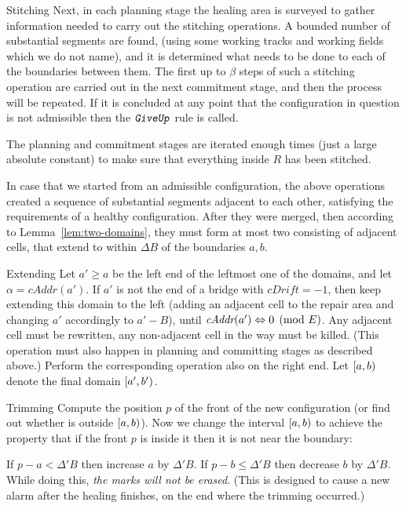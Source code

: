 \documentclass[12pt]{memoir}
\renewcommand{\le}{\leq}
\newcommand{\fld}[1]{\ensuremath{\textit{#1}}}
\newcommand{\rul}[1]{\ensuremath{\texttt{\slshape #1\/}}}
\def\B{B}
\newcommand{\E}{E}
\newcommand{\cAddr}{\fld{cAddr}}
\newcommand{\cDrift}{\fld{cDrift}}
\newcommand{\GiveUp}{\rul{GiveUp}}
\begin{document}
\begin{flushdescription}
\item[Stitching] Next, in each planning stage 
the healing area is surveyed to gather information needed to carry out the
stitching operations.
A bounded number of substantial segments are found, (using some working tracks and working
fields which we do not name), and it is determined what needs to be done
to each of the boundaries between them.
The first up to \( \beta \) steps of such a stitching operation are carried out in the
next commitment stage, and then the process will be repeated.
If it is concluded at any point that the configuration in question is not admissible
then the \( \GiveUp \) rule is called.

The planning and commitment stages are iterated enough times (just a large absolute constant)
to make sure that everything inside \( R \) has been stitched.

In case that we started from an admissible configuration, the above operations
created a sequence of substantial segments adjacent to each other, satisfying the 
requirements of a healthy configuration.
After they were merged, then according to Lemma~\ref{lem:two-domains},
they must form at most two  consisting of adjacent cells, that extend
to within \( \Delta\B \) of the boundaries \( a,b \).

\item[Extending]
Let \( a'\ge a \) be the left end of the leftmost one of the domains,
and let \( \alpha=\cAddr(a') \).
If \( a' \) is not the end of a bridge with \( \cDrift=-1 \), then
keep extending this domain to the left (adding an adjacent cell
to the repair area and changing \( a' \) accordingly to \( a'-\B \)),
until \( \cAddr(a')\eqv 0\pmod{\E} \).
Any adjacent cell must be rewritten, any non-adjacent cell in the way must be killed.
(This operation must also happen in planning and committing stages as described above.)
Perform the corresponding operation also on the right end.
Let \( [a,b) \) denote the final domain \( [a',b') \).

\item[Trimming]
Compute the position \( p \) of the front of the new configuration (or find out whether
is outside \( [a,b) \)).
Now we change the interval
\( [a,b) \) to achieve the property that if the front \( p \) is inside it then it is not near
the boundary:

If \( p - a < \Delta'\B \) then increase \( a \) by \( \Delta'\B \).
If \( p - b \le \Delta'\B \) then decrease \( b \) by \( \Delta'\B \).
While doing this, \emph{the marks will not be erased}.
(This is designed to cause a new alarm after the healing finishes,
on the end where the trimming occurred.)


\end{flushdescription}
\end{document}
